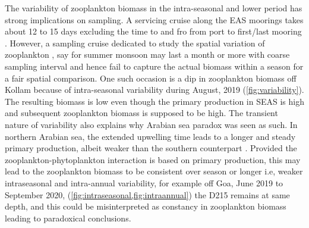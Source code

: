 \documentclass{article}
\begin{document}
	The variability of zooplankton biomass in the intra-seasonal and lower period has strong implications on sampling. A servicing cruise along the EAS moorings takes about 12 to 15 days excluding the time to and fro from port to first/last mooring \citep{chaudhuri2020observed, aparna2022seasonal}. However, a sampling cruise dedicated to study the spatial variation of zooplankton \citep{madhupratap1992zooplankton,smith1998seasonal,wishner1998mesozooplankton, kidwai2000dd}, say for summer monsoon may last a month or more with coarse sampling interval and hence fail to capture the actual biomass within a season for a fair spatial comparison. One such occasion is a dip in zooplankton biomass off Kollam because of intra-seasonal variability during August, 2019 (\cref{fig:variability}). The resulting biomass is low even though the primary production in SEAS \citep{ashadevi20101070, jyothibabu2010re} is high and subsequent zooplankton biomass is supposed to be high. The transient nature of variability also explains why Arabian sea paradox was seen as such. In northern Arabian sea, the extended upwelling time leads to a longer and steady primary production, albeit weaker than the southern counterpart \citep{madhupratap1996lack, smith2005mesozooplankton}. Provided the zooplankton-phytoplankton interaction is based on primary production, this may lead to the zooplankton biomass to be consistent over season or longer i.e, weaker intraseasonal and intra-annual variability, for example off Goa, June 2019 to September 2020, (\cref{fig:intraseasonal,fig:intraannual}) the D215 remains at same depth, and this could be misinterpreted as constancy in zooplankton biomass leading to paradoxical conclusions. 	 
	
	
\end{document}
